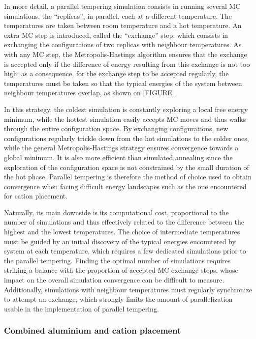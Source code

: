 \documentclass[main.tex]{subfiles}
\begin{document}
In more detail, a parallel tempering simulation consists in running several MC simulations, the ``replicas'', in parallel, each at a different temperature. The temperatures are taken between room temperature and a hot temperature. An extra MC step is introduced, called the ``exchange'' step, which consists in exchanging the configurations of two replicas with neighbour temperatures. As with any MC step, the Metropolis-Hastings algorithm ensures that the exchange is accepted only if the difference of energy resulting from this exchange is not too high: as a consequence, for the exchange step to be accepted regularly, the temperatures must be taken so that the typical energies of the system between neighbour temperatures overlap, as shown on [FIGURE].

In this strategy, the coldest simulation is constantly exploring a local free energy minimum, while the hottest simulation easily accepts MC moves and thus walks through the entire configuration space. By exchanging configurations, new configurations regularly trickle down from the hot simulations to the colder ones, while the general Metropolis-Hastings strategy ensures convergence towards a global minimum. It is also more efficient than simulated annealing since the exploration of the configuration space is not constrained by the small duration of the hot phase. Parallel tempering is therefore the method of choice used to obtain convergence when facing difficult energy landscapes such as the one encountered for cation placement.

Naturally, its main downside is its computational cost, proportional to the number of simulations and thus effectively related to the difference between the highest and the lowest temperatures. The choice of intermediate temperatures must be guided by an initial discovery of the typical energies encountered by system at each temperature, which requires a few dedicated simulations prior to the parallel tempering. Finding the optimal number of simulations requires striking a balance with the proportion of accepted MC exchange steps, whose impact on the overall simulation convergence can be difficult to measure. Additionally, simulations with neighbour temperatures must regularly synchronize to attempt an exchange, which strongly limits the amount of parallelization usable in the implementation of parallel tempering.

\subsubsection{Combined aluminium and cation placement} %
\end{document}
